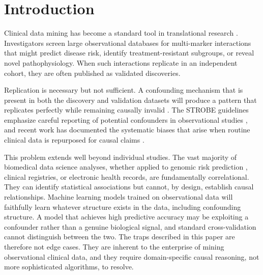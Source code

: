 \documentclass[10pt,letterpaper]{article}
\begin{document}
\vspace{12pt}

\section{Introduction}

Clinical data mining has become a standard tool in translational research \cite{shtar2024, pepe2008}. Investigators screen large observational databases for multi-marker interactions that might predict disease risk, identify treatment-resistant subgroups, or reveal novel pathophysiology. When such interactions replicate in an independent cohort, they are often published as validated discoveries.

Replication is necessary but not sufficient. A confounding mechanism that is present in both the discovery and validation datasets will produce a pattern that replicates perfectly while remaining causally invalid \cite{ioannidis2005}. The STROBE guidelines emphasize careful reporting of potential confounders in observational studies \cite{vandenbroucke2007}, and recent work has documented the systematic biases that arise when routine clinical data is repurposed for causal claims \cite{pfaffenlehner2025, doutreligne2025}.

This problem extends well beyond individual studies. The vast majority of biomedical data science analyses, whether applied to genomic risk prediction \cite{fatapour2025, toh2021}, clinical registries, or electronic health records, are fundamentally correlational. They can identify statistical associations but cannot, by design, establish causal relationships. Machine learning models trained on observational data will faithfully learn whatever structure exists in the data, including confounding structure. A model that achieves high predictive accuracy may be exploiting a confounder rather than a genuine biological signal, and standard cross-validation cannot distinguish between the two. The traps described in this paper are therefore not edge cases. They are inherent to the enterprise of mining observational clinical data, and they require domain-specific causal reasoning, not more sophisticated algorithms, to resolve.
\end{document}
